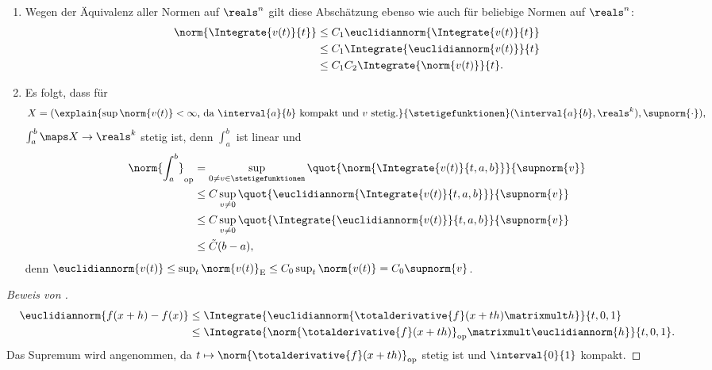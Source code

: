 \begin{bemerkungen*}
    \begin{enumerate}
        \item Wegen der Äquivalenz aller Normen auf \( \reals^n \) gilt diese Abschätzung ebenso wie  auch für beliebige Normen auf \( \reals^n \):
        \begin{equation*}
            \begin{split}
                \norm{\Integrate{v(t)}{t}}&\leq C_1\euclidiannorm{\Integrate{v(t)}{t}}\\
                &\leq C_1\Integrate{\euclidiannorm{v(t)}}{t}\\
                &\leq C_1 C_2 \Integrate{\norm{v(t)}}{t}.
            \end{split}
        \end{equation*}
        \item Es folgt, dass für
        \begin{equation*}
            X=(\explain{\sup\norm{v(t)}<\infty \text{, da \( \interval{a}{b} \) kompakt und \( v \) stetig.}}{\stetigefunktionen}(\interval{a}{b},\reals^k),\supnorm{\cdot}),
        \end{equation*}
        \( \int_a^b\maps X\to \reals^k \) stetig ist, denn \( \int_a^b \) ist linear und
        \begin{equation*}
            \begin{split}
                \norm{\int_a^b}_{\text{op}}&=\sup_{0\neq v \in \stetigefunktionen}\quot{\norm{\Integrate{v(t)}{t,a,b}}}{\supnorm{v}}\\
                &\leq C\sup_{v\neq 0}\quot{\euclidiannorm{\Integrate{v(t)}{t,a,b}}}{\supnorm{v}}\\
                &\leq C\sup_{v\neq 0}\quot{\Integrate{\euclidiannorm{v(t)}}{t,a,b}}{\supnorm{v}}\\
                &\leq \tilde{C}(b-a),
            \end{split}
        \end{equation*}
        denn \( \euclidiannorm{v(t)}\leq \sup_{t}\norm{v(t)}_\text{E}\leq C_0\sup_t\norm{v(t)}=C_0\supnorm{v} \).
    \end{enumerate}
\end{bemerkungen*}
\begin{proof}[Beweis von ]
    \begin{equation*}
        \begin{split}
            \euclidiannorm{f(x+h)-f(x)}&\leq \Integrate{\euclidiannorm{\totalderivative{f}(x+th)\matrixmult h}}{t,0,1}\\
            &\leq \Integrate{\norm{\totalderivative{f}(x+th)}_{\text{op}}\matrixmult \euclidiannorm{h}}{t,0,1}.
        \end{split}
    \end{equation*}
    Das Supremum wird angenommen, da \( t\mapsto \norm{\totalderivative{f}(x+th)}_{\text{op}} \) stetig ist und \( \interval{0}{1} \) kompakt.
\end{proof}
